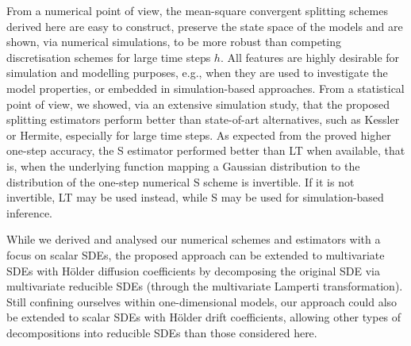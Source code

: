 \documentclass[a4paper,12pt]{article}
\numberwithin{equation}{section}
\theoremstyle{plain}
\theoremstyle{definition}
\begin{document}
From a numerical point of view, the mean-square convergent splitting schemes derived here are easy to construct,  preserve the state space of the models and are shown, via numerical simulations, to be more robust than competing discretisation schemes for large time steps $h$. All features are highly desirable for simulation and modelling purposes, e.g., when they are  used to investigate the model properties, or embedded in simulation-based approaches. From a statistical point of view,  we showed, via an extensive simulation study, that the proposed splitting estimators perform better than state-of-art alternatives, such as Kessler or Hermite, especially for large time steps. As expected from the proved higher one-step accuracy, the S estimator performed better than LT when available, that is, when the underlying function mapping a Gaussian distribution to the distribution of the one-step numerical S scheme is invertible. If it is not invertible, LT
may be used instead, while S may be used for simulation-based inference.

While we derived and analysed our numerical schemes and estimators with a focus on scalar SDEs, the proposed approach can be extended to multivariate SDEs with H\"older diffusion coefficients by decomposing the original SDE via multivariate reducible SDEs (through the multivariate Lamperti transformation). Still confining ourselves within one-dimensional models, our approach could also be extended to scalar SDEs with H\"older drift coefficients, allowing other types of decompositions into reducible SDEs than those considered here.
\end{document}
